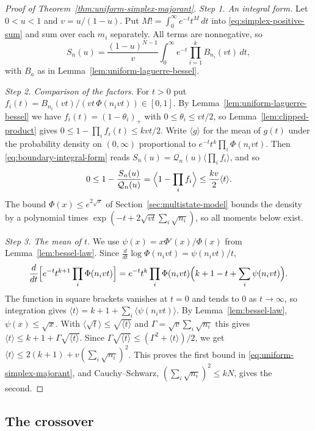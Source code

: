 \begin{proof}[Proof of Theorem~\ref{thm:uniform-simplex-majorant}]
\emph{Step 1. An integral form.} Let $0<u<1$ and $v=u/(1-u)$. Put
$M!=\int_0^\infty e^{-t}t^M\,dt$ into \eqref{eq:simplex-positive-sum} and sum
over each $m_i$ separately. All terms are nonnegative, so
\begin{equation}\label{eq:boundary-integral-form}
S_n(u)=\frac{(1-u)^{N-1}}{v}\int_0^\infty e^{-t}\prod_{i=1}^kB_{n_i}(vt)\,dt,
\end{equation}
with $B_a$ as in Lemma~\ref{lem:uniform-laguerre-bessel}.

\emph{Step 2. Comparison of the factors.} For $t>0$ put
$f_i(t)=B_{n_i}(vt)/(vt\,\Phi(n_ivt))\in[0,1]$. By
Lemma~\ref{lem:uniform-laguerre-bessel} we have $f_i(t)=(1-\theta_i)_+$ with
$0\le\theta_i\le vt/2$, so Lemma~\ref{lem:clipped-product} gives
$0\le1-\prod_if_i(t)\le kvt/2$. Write $\langle g\rangle$ for the mean of
$g(t)$ under the probability density on $(0,\infty)$ proportional to
$e^{-t}t^k\prod_i\Phi(n_ivt)$. Then \eqref{eq:boundary-integral-form} reads
$S_n(u)=\mathcal Q_n(u)\langle\prod_if_i\rangle$, and so
\[
0\le1-\frac{S_n(u)}{\mathcal Q_n(u)}=\Bigl\langle1-\prod_if_i\Bigr\rangle
\le\frac{kv}{2}\langle t\rangle.
\]
The bound $\Phi(x)\le e^{2\sqrt x}$ of Section~\ref{sec:multistate-model}
bounds the density by a polynomial times
$\exp(-t+2\sqrt{vt}\sum_i\sqrt{n_i})$, so all moments below exist.

\emph{Step 3. The mean of $t$.} We use $\psi(x)=x\Phi'(x)/\Phi(x)$ from
Lemma~\ref{lem:bessel-law}. Since $\frac d{dt}\log\Phi(n_ivt)=\psi(n_ivt)/t$,
\[
\frac{d}{dt}\Bigl[e^{-t}t^{k+1}\prod_i\Phi(n_ivt)\Bigr]
=e^{-t}t^k\prod_i\Phi(n_ivt)\Bigl(k+1-t+\sum_i\psi(n_ivt)\Bigr).
\]
The function in square brackets vanishes at $t=0$ and tends to $0$ as
$t\to\infty$, so integration gives
$\langle t\rangle=k+1+\sum_i\langle\psi(n_ivt)\rangle$. By
Lemma~\ref{lem:bessel-law}, $\psi(x)\le\sqrt x$. With
$\langle\sqrt t\rangle\le\sqrt{\langle t\rangle}$ and
$\Gamma=\sqrt v\sum_i\sqrt{n_i}$ this gives
$\langle t\rangle\le k+1+\Gamma\sqrt{\langle t\rangle}$. Since
$\Gamma\sqrt{\langle t\rangle}\le(\Gamma^2+\langle t\rangle)/2$, we get
$\langle t\rangle\le2(k+1)+v(\sum_i\sqrt{n_i})^2$. This proves the first
bound in \eqref{eq:uniform-simplex-majorant}, and Cauchy--Schwarz,
$(\sum_i\sqrt{n_i})^2\le kN$, gives the second.
\end{proof}

\subsection{The crossover}

